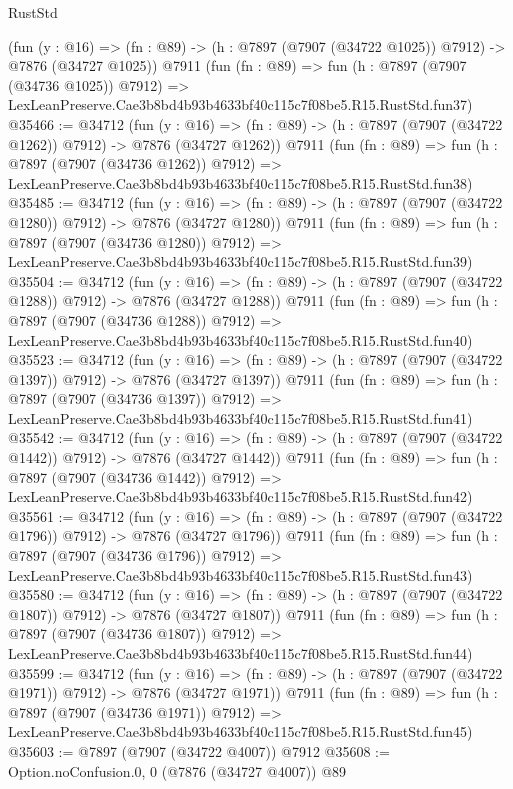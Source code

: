 \begin{lexlean}{RustStd}
\begin{coremodule}
    (fun (y : @16) =>
    (fn : @89) -> (h : @7897 (@7907 (@34722 @1025)) @7912) -> @7876 (@34727 @1025))
    @7911
    (fun (fn : @89) =>
    fun (h : @7897 (@7907 (@34736 @1025)) @7912) =>
    LexLeanPreserve.Cae3b8bd4b93b4633bf40c115c7f08be5.R15.RustStd.fun37)
@35466 := @34712
    (fun (y : @16) =>
    (fn : @89) -> (h : @7897 (@7907 (@34722 @1262)) @7912) -> @7876 (@34727 @1262))
    @7911
    (fun (fn : @89) =>
    fun (h : @7897 (@7907 (@34736 @1262)) @7912) =>
    LexLeanPreserve.Cae3b8bd4b93b4633bf40c115c7f08be5.R15.RustStd.fun38)
@35485 := @34712
    (fun (y : @16) =>
    (fn : @89) -> (h : @7897 (@7907 (@34722 @1280)) @7912) -> @7876 (@34727 @1280))
    @7911
    (fun (fn : @89) =>
    fun (h : @7897 (@7907 (@34736 @1280)) @7912) =>
    LexLeanPreserve.Cae3b8bd4b93b4633bf40c115c7f08be5.R15.RustStd.fun39)
@35504 := @34712
    (fun (y : @16) =>
    (fn : @89) -> (h : @7897 (@7907 (@34722 @1288)) @7912) -> @7876 (@34727 @1288))
    @7911
    (fun (fn : @89) =>
    fun (h : @7897 (@7907 (@34736 @1288)) @7912) =>
    LexLeanPreserve.Cae3b8bd4b93b4633bf40c115c7f08be5.R15.RustStd.fun40)
@35523 := @34712
    (fun (y : @16) =>
    (fn : @89) -> (h : @7897 (@7907 (@34722 @1397)) @7912) -> @7876 (@34727 @1397))
    @7911
    (fun (fn : @89) =>
    fun (h : @7897 (@7907 (@34736 @1397)) @7912) =>
    LexLeanPreserve.Cae3b8bd4b93b4633bf40c115c7f08be5.R15.RustStd.fun41)
@35542 := @34712
    (fun (y : @16) =>
    (fn : @89) -> (h : @7897 (@7907 (@34722 @1442)) @7912) -> @7876 (@34727 @1442))
    @7911
    (fun (fn : @89) =>
    fun (h : @7897 (@7907 (@34736 @1442)) @7912) =>
    LexLeanPreserve.Cae3b8bd4b93b4633bf40c115c7f08be5.R15.RustStd.fun42)
@35561 := @34712
    (fun (y : @16) =>
    (fn : @89) -> (h : @7897 (@7907 (@34722 @1796)) @7912) -> @7876 (@34727 @1796))
    @7911
    (fun (fn : @89) =>
    fun (h : @7897 (@7907 (@34736 @1796)) @7912) =>
    LexLeanPreserve.Cae3b8bd4b93b4633bf40c115c7f08be5.R15.RustStd.fun43)
@35580 := @34712
    (fun (y : @16) =>
    (fn : @89) -> (h : @7897 (@7907 (@34722 @1807)) @7912) -> @7876 (@34727 @1807))
    @7911
    (fun (fn : @89) =>
    fun (h : @7897 (@7907 (@34736 @1807)) @7912) =>
    LexLeanPreserve.Cae3b8bd4b93b4633bf40c115c7f08be5.R15.RustStd.fun44)
@35599 := @34712
    (fun (y : @16) =>
    (fn : @89) -> (h : @7897 (@7907 (@34722 @1971)) @7912) -> @7876 (@34727 @1971))
    @7911
    (fun (fn : @89) =>
    fun (h : @7897 (@7907 (@34736 @1971)) @7912) =>
    LexLeanPreserve.Cae3b8bd4b93b4633bf40c115c7f08be5.R15.RustStd.fun45)
@35603 := @7897 (@7907 (@34722 @4007)) @7912
@35608 := Option.noConfusion.{0, 0} (@7876 (@34727 @4007)) @89

\end{coremodule}
\end{lexlean}
